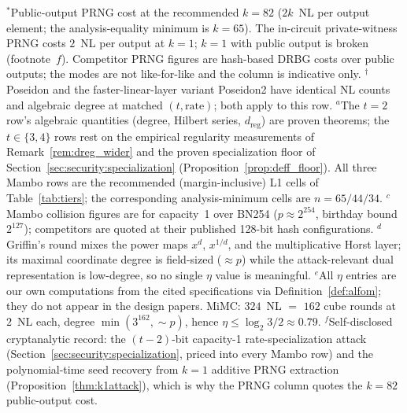 \documentclass[11pt,a4paper]{article}
\theoremstyle{definition}
\begin{document}
\begin{table}[t]
\footnotesize
$^*$Public-output PRNG cost at the recommended $k = 82$ ($2k$~NL per
output element; the analysis-equality minimum is $k = 65$). The
in-circuit private-witness PRNG costs $2$~NL per output at $k = 1$;
$k = 1$ with public output is broken (footnote~$f$).
Competitor PRNG figures are hash-based DRBG costs over public outputs;
the modes are not like-for-like and the column is indicative only.
$^\dagger$Poseidon and the faster-linear-layer variant Poseidon2 have
identical NL counts and algebraic degree at matched $(t, \mathrm{rate})$;
both \cite{Poseidon,Poseidon2} apply to this row.
$^{a}$The $t=2$ row's algebraic quantities (degree, Hilbert series,
$d_{\mathrm{reg}}$) are proven theorems; the $t \in \{3,4\}$ rows rest
on the empirical regularity measurements of
Remark~\ref{rem:dreg_wider} and the proven specialization floor of
Section~\ref{sec:security:specialization}
(Proposition~\ref{prop:deff_floor}). All three Mambo rows are
the recommended (margin-inclusive) L1 cells of Table~\ref{tab:tiers};
the corresponding analysis-minimum cells are $n = 65/44/34$.
$^{c}$Mambo collision figures are for capacity~1 over BN254
($p \approx 2^{254}$, birthday bound $2^{127}$); competitors are
quoted at their published 128-bit hash configurations.
$^{d}$Griffin's round mixes the power maps $x^d$, $x^{1/d}$, and the
multiplicative Horst layer; its maximal coordinate degree is
field-sized ($\approx p$) while the attack-relevant dual
representation is low-degree, so no single $\eta$ value is meaningful.
$^{e}$All $\eta$ entries are our own computations from the cited
specifications via Definition~\ref{def:alfom}; they do not appear in
the design papers. MiMC: $324$~NL $=$ $162$ cube rounds at $2$~NL
each, degree $\min(3^{162}, {\sim}p)$, hence $\eta \le \log_2 3 / 2
\approx 0.79$.
$^{f}$Self-disclosed cryptanalytic record: the $(t-2)$-bit capacity-1
rate-specialization attack
(Section~\ref{sec:security:specialization}, priced into every Mambo
row) and the polynomial-time seed recovery from $k=1$ additive PRNG
extraction (Proposition~\ref{thm:k1attack}), which is why the PRNG
column quotes the $k = 82$ public-output cost.
\end{table}
\end{document}
